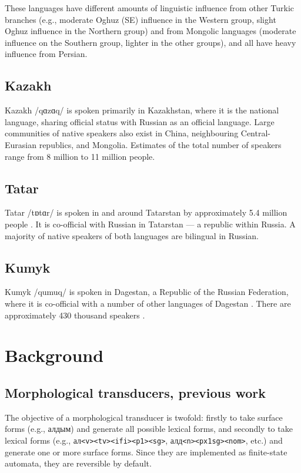 \documentclass[a4paper,11pt,twocolumn]{article}
\begin{document}
These languages have different amounts of linguistic influence from other Turkic branches (e.g., moderate Oghuz (SE) influence in the Western group, slight Oghuz influence in the Northern group) and from Mongolic languages (moderate influence on the Southern group, lighter in the other groups), and all have heavy influence from Persian.

\subsection{Kazakh}
Kazakh /q{\symbl ɑ}z{\symbl ɑ}q/ is spoken primarily in Kazakhstan, where it is the national language, sharing official status with Russian as an official language.  Large communities of native speakers also exist in China, neighbouring Central-Eurasian republics, and Mongolia.  Estimates of the total number of speakers range from 8 million \citep{ethnologue} to 11 million \citep{nationalencyklopedin} people.

\subsection{Tatar}
Tatar /t{\symbl ɒ}t{\symbl ɑ}r/ is spoken in and around Tatarstan by approximately 5.4 million people \citep{ethnologue}.  It is co-official with Russian in Tatarstan --- a republic within Russia.  A majority of native speakers of both languages are bilingual in Russian. %

\subsection{Kumyk}
Kumyk /qumuq/ is spoken in Dagestan, a Republic of the Russian Federation, where it is co-official with a number of other languages of Dagestan \citep{ethnologue}.  There are approximately 430 thousand speakers \citep{ethnologue}.

\section{Background}
\subsection{Morphological transducers, previous work}
The objective of a morphological transducer is twofold: firstly to take surface forms (e.g., алдым) and generate all possible lexical forms, and secondly to take lexical forms (e.g.,  ал{\tt {\small <v><tv><ifi><p1><sg>}}, алд{\tt {\small <n><px1sg><nom>}}, etc.) and generate one or more surface forms.  Since they are implemented as finite-state automata, they are reversible by default.
\end{document}
